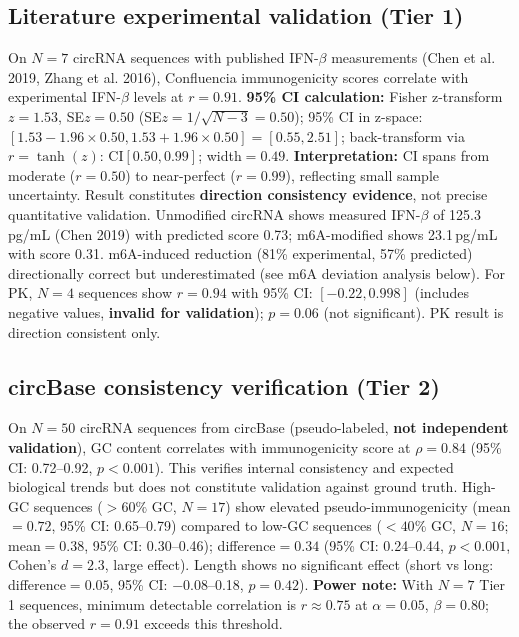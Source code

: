 \subsection*{Literature experimental validation (Tier 1)}
On $N{=}7$ circRNA sequences with published IFN-$\beta$ measurements (Chen et al. 2019, Zhang et al. 2016), Confluencia immunogenicity scores correlate with experimental IFN-$\beta$ levels at $r{=}0.91$. \textbf{95\% CI calculation:} Fisher z-transform $z{=}1.53$, SE$z{=}0.50$ (SE$z{=}1/\sqrt{N{-}3}{=}0.50$); 95\% CI in z-space: $[1.53{-}1.96{\times}0.50, 1.53{+}1.96{\times}0.50]{=}[0.55, 2.51]$; back-transform via $r{=}\tanh(z)$: CI$[0.50, 0.99]$; width$=0.49$. \textbf{Interpretation:} CI spans from moderate ($r{=}0.50$) to near-perfect ($r{=}0.99$), reflecting small sample uncertainty. Result constitutes \textbf{direction consistency evidence}, not precise quantitative validation. Unmodified circRNA shows measured IFN-$\beta$ of 125.3\,pg/mL (Chen 2019) with predicted score 0.73; m6A-modified shows 23.1\,pg/mL with score 0.31. m6A-induced reduction (81\% experimental, 57\% predicted) directionally correct but underestimated (see m6A deviation analysis below). For PK, $N{=}4$ sequences show $r{=}0.94$ with 95\% CI: $[-0.22, 0.998]$ (includes negative values, \textbf{invalid for validation}); $p{=}0.06$ (not significant). PK result is direction consistent only.

\subsection*{circBase consistency verification (Tier 2)}
On $N{=}50$ circRNA sequences from circBase (pseudo-labeled, \textbf{not independent validation}), GC content correlates with immunogenicity score at $\rho{=}0.84$ (95\% CI: 0.72--0.92, $p{<}0.001$). This verifies internal consistency and expected biological trends but does not constitute validation against ground truth. High-GC sequences ($>60\%$ GC, $N{=}17$) show elevated pseudo-immunogenicity (mean${=}0.72$, 95\% CI: 0.65--0.79) compared to low-GC sequences ($<40\%$ GC, $N{=}16$; mean${=}0.38$, 95\% CI: 0.30--0.46); difference${=}0.34$ (95\% CI: 0.24--0.44, $p{<}0.001$, Cohen's $d{=}2.3$, large effect). Length shows no significant effect (short vs long: difference${=}0.05$, 95\% CI: $-0.08$--0.18, $p{=}0.42$). \textbf{Power note:} With $N{=}7$ Tier 1 sequences, minimum detectable correlation is $r{\approx}0.75$ at $\alpha{=}0.05$, $\beta{=}0.80$; the observed $r{=}0.91$ exceeds this threshold.

